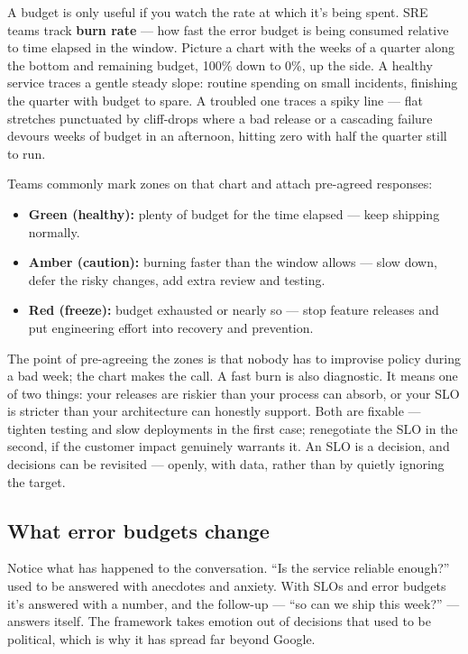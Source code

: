 A budget is only useful if you watch the rate at which it's being spent. SRE teams track \textbf{burn rate} — how fast the error budget is being consumed relative to time elapsed in the window. Picture a chart with the weeks of a quarter along the bottom and remaining budget, 100\% down to 0\%, up the side. A healthy service traces a gentle steady slope: routine spending on small incidents, finishing the quarter with budget to spare. A troubled one traces a spiky line — flat stretches punctuated by cliff-drops where a bad release or a cascading failure devours weeks of budget in an afternoon, hitting zero with half the quarter still to run.


Teams commonly mark zones on that chart and attach pre-agreed responses:


\begin{itemize}[leftmargin=*]
\item \textbf{Green (healthy):} plenty of budget for the time elapsed — keep shipping normally.
\item \textbf{Amber (caution):} burning faster than the window allows — slow down, defer the risky changes, add extra review and testing.
\item \textbf{Red (freeze):} budget exhausted or nearly so — stop feature releases and put engineering effort into recovery and prevention.
\end{itemize}

The point of pre-agreeing the zones is that nobody has to improvise policy during a bad week; the chart makes the call. A fast burn is also diagnostic. It means one of two things: your releases are riskier than your process can absorb, or your SLO is stricter than your architecture can honestly support. Both are fixable — tighten testing and slow deployments in the first case; renegotiate the SLO in the second, if the customer impact genuinely warrants it. An SLO is a decision, and decisions can be revisited — openly, with data, rather than by quietly ignoring the target.



\subsection{What error budgets change}


Notice what has happened to the conversation. ``Is the service reliable enough?'' used to be answered with anecdotes and anxiety. With SLOs and error budgets it's answered with a number, and the follow-up — ``so can we ship this week?'' — answers itself. The framework takes emotion out of decisions that used to be political, which is why it has spread far beyond Google.


